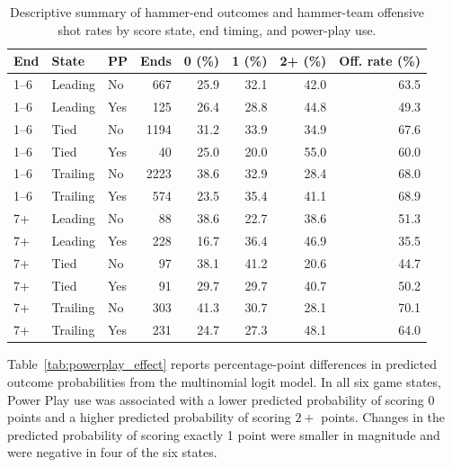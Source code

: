 \documentclass[titlepage, 12pt]{article}
\begin{document}
\begin{table}[htbp]
        \centering
        \caption{Descriptive summary of hammer-end outcomes and hammer-team offensive shot
                rates by score state, end timing, and power-play use.}
        \label{tab:descriptive}
        \small
        \setlength{\tabcolsep}{4pt}
        \begin{tabular}{lllrrrrr}
                \toprule
                End  & State    & PP  & Ends & 0 (\%) & 1 (\%) & 2+ (\%) & Off. rate (\%) \\
                \midrule
                1--6 & Leading  & No  & 667  & 25.9   & 32.1   & 42.0    & 63.5           \\
                1--6 & Leading  & Yes & 125  & 26.4   & 28.8   & 44.8    & 49.3           \\
                1--6 & Tied     & No  & 1194 & 31.2   & 33.9   & 34.9    & 67.6           \\
                1--6 & Tied     & Yes & 40   & 25.0   & 20.0   & 55.0    & 60.0           \\
                1--6 & Trailing & No  & 2223 & 38.6   & 32.9   & 28.4    & 68.0           \\
                1--6 & Trailing & Yes & 574  & 23.5   & 35.4   & 41.1    & 68.9           \\
                7+   & Leading  & No  & 88   & 38.6   & 22.7   & 38.6    & 51.3           \\
                7+   & Leading  & Yes & 228  & 16.7   & 36.4   & 46.9    & 35.5           \\
                7+   & Tied     & No  & 97   & 38.1   & 41.2   & 20.6    & 44.7           \\
                7+   & Tied     & Yes & 91   & 29.7   & 29.7   & 40.7    & 50.2           \\
                7+   & Trailing & No  & 303  & 41.3   & 30.7   & 28.1    & 70.1           \\
                7+   & Trailing & Yes & 231  & 24.7   & 27.3   & 48.1    & 64.0           \\
                \bottomrule
        \end{tabular}
\end{table}

Table~\ref{tab:powerplay_effect} reports percentage-point differences in
predicted outcome probabilities from the multinomial logit model. In all six
game states, Power Play use was associated with a lower predicted probability
of scoring 0 points and a higher predicted probability of scoring \(2+\)
points. Changes in the predicted probability of scoring exactly 1 point were
smaller in magnitude and were negative in four of the six states.
\end{document}
